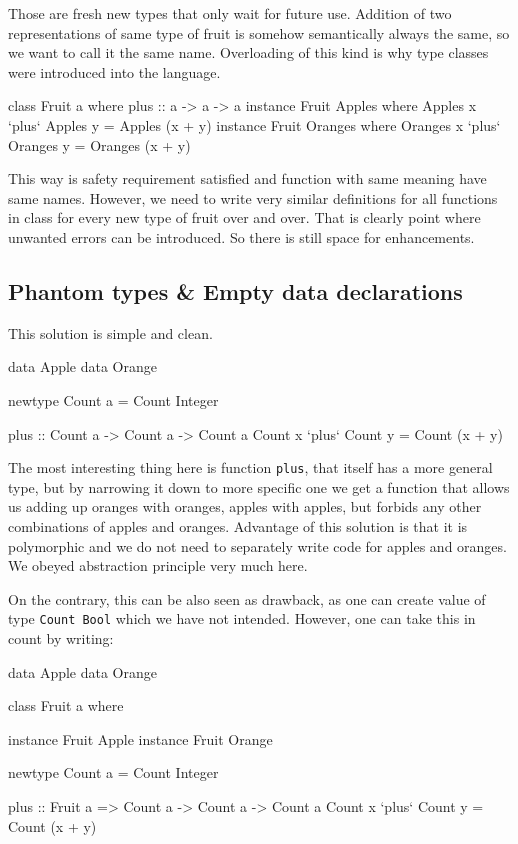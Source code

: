 \documentclass[11pt,oneside,draft]{fithesis2}
\theoremstyle{definition}
\begin{document}
Those are fresh new types that only wait for future use.
Addition of two representations of same type of fruit is somehow semantically
always the same, so we want to call it the same name. Overloading of this kind is why
type classes were introduced into the language.
\begin{code}
class Fruit a where
    plus :: a -> a -> a
instance Fruit Apples where
	Apples x `plus` Apples y = Apples (x + y)
instance Fruit Oranges where
	Oranges x `plus` Oranges y = Oranges (x + y)
\end{code}

This way is safety requirement satisfied and function
with same meaning have same names. However, we need to write
very similar definitions for all functions in class
for every new type of fruit over and over. That is clearly
point where unwanted errors can be introduced. So there is still
space for enhancements.

\subsection{Phantom types \& Empty data declarations}

This solution is simple and clean.
\begin{code}
data Apple
data Orange

newtype Count a = Count Integer

plus :: Count a -> Count a -> Count a
Count x `plus` Count y = Count (x + y)
\end{code}
The most interesting thing here is function \texttt{plus}, that itself has a more general type, but
by narrowing it down to more specific one we get a function that allows us
adding up oranges with oranges, apples with apples, but forbids any other combinations
of apples and oranges. Advantage of this solution is that it is polymorphic
and we do not need to separately write code for apples and oranges.
We obeyed abstraction principle very much here.

On the contrary, this can be also seen as drawback, as one can create value
of type \texttt{Count Bool} which we have not intended. However,
one can take this in count by writing:
\begin{code}
data Apple
data Orange

class Fruit a where

instance Fruit Apple
instance Fruit Orange

newtype Count a = Count Integer

plus :: Fruit a => Count a -> Count a -> Count a
Count x `plus` Count y = Count (x + y)
\end{code}
\end{document}
